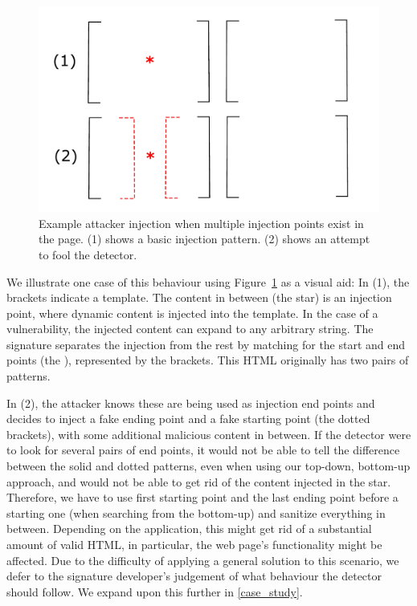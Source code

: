 \begin{figure}[h]
	\includegraphics[scale=0.25]{img/attacker_injection_compound.pdf}
	\caption{Example attacker injection when multiple injection points exist in the page. (1) shows a basic injection pattern. (2) shows an attempt to fool the detector.}
	\label{fig:attacker_injection}
\end{figure}

We illustrate one case of this behaviour using Figure~\ref{fig:attacker_injection} as a visual aid: In (1), the brackets indicate a template. The content in between (the star) is an injection point, where dynamic content is injected into the template. In the case of a vulnerability, the injected content can expand to any arbitrary string. The signature separates the injection from the rest by matching for the start and end points (the ), represented by the brackets. This HTML originally has two pairs of  patterns.

In (2), the attacker knows these are being used as injection end points and decides to inject a fake ending point and a fake starting point (the dotted brackets), with some additional malicious content in between. If the detector were to look for several pairs of end points, it would not be able to tell the difference between the solid and dotted patterns, even when using our top-down, bottom-up approach, and would not be able to get rid of the content injected in the star. Therefore, we have to use first starting point and the last ending point before a starting one (when searching from the bottom-up) and sanitize everything in between. Depending on the application, this might get rid of a substantial amount of valid HTML, in particular, the web page's functionality might be affected. Due to the difficulty of applying a general solution to this scenario, we defer to the signature developer's judgement of what behaviour the detector should follow. We expand upon this further in \autoref{case_study}.


